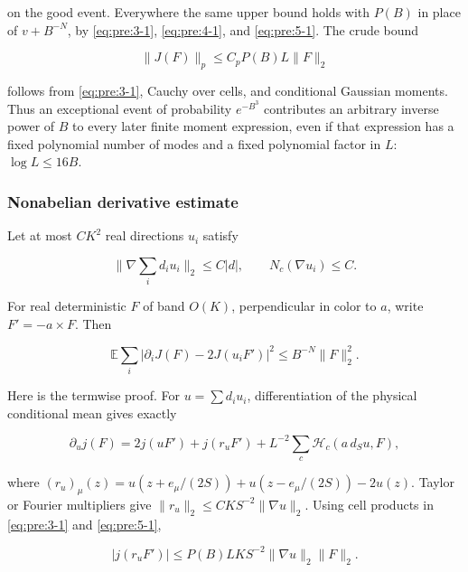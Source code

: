 on the good event. Everywhere the same upper bound holds with \(P(B)\) in place of \(v+B^{-N}\), by \eqref{eq:pre:3-1}, \eqref{eq:pre:4-1}, and \eqref{eq:pre:5-1}. The crude bound

\begin{equation}
\|J(F)\|_p\leq C_pP(B)L\|F\|_2
\label{eq:pre:5-5}
\end{equation}

follows from \eqref{eq:pre:3-1}, Cauchy over cells, and conditional Gaussian moments. Thus an exceptional event of probability \(e^{-B^3}\) contributes an arbitrary inverse power of \(B\) to every later finite moment expression, even if that expression has a fixed polynomial number of modes and a fixed polynomial factor in \(L\): \(\log L\leq16B\).

\subsubsection{Nonabelian derivative estimate}\label{pre:part-5-3}

Let at most \(CK^2\) real directions \(u_i\) satisfy

\begin{equation}
\|\nabla\sum_i d_i u_i\|_2\leq C|d|,\qquad
N_c(\nabla u_i)\leq C.
\label{eq:pre:5-6}
\end{equation}

For real deterministic \(F\) of band \(O(K)\), perpendicular in color to \(a\), write \(F'=-a\times F\). Then

\begin{equation}
\mathbb E\sum_i|\partial_iJ(F)-2J(u_iF')|^2
\leq B^{-N}\|F\|_2^2.
\label{eq:pre:5-7}
\end{equation}

Here is the termwise proof. For \(u=\sum d_iu_i\), differentiation of the physical conditional mean gives exactly

\begin{equation}
\partial_u j(F)=2j(uF')+j(r_uF')
+L^{-2}\sum_c\mathcal H_c(a\,d_Su,F),
\label{eq:pre:5-8}
\end{equation}

where \((r_u)_\mu(z)=u(z+e_\mu/(2S))+u(z-e_\mu/(2S))-2u(z)\). Taylor or Fourier multipliers give
\(\|r_u\|_2\leq CK S^{-2}\|\nabla u\|_2\).
Using cell products in \eqref{eq:pre:3-1} and \eqref{eq:pre:5-1},

\begin{equation}
|j(r_uF')|\leq P(B)LK S^{-2}\|\nabla u\|_2\|F\|_2.
\label{eq:pre:5-9}
\end{equation}

